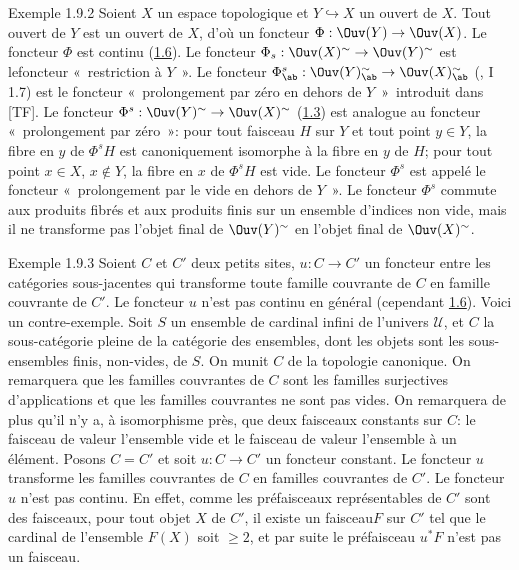 \documentclass[10pt]{../fichiers-configuration-latex/smfart}
\begin{document}
\begin{enonce*}[remark]{Exemple 1.9.2}
Soient $X$ un espace topologique et $Y\hookrightarrow X$ un ouvert
de $X$. Tout ouvert de $Y$ est un ouvert de $X$, d'où un foncteur
$\Phi:\Ouv(Y)\rightarrow \Ouv(X)$. Le foncteur $\Phi$ est continu
(\hyperref[III.prop1.6]{1.6}). Le foncteur $\Phi_s:\Ouv(X)^{\sim}\rightarrow
\Ouv(Y)^{\sim}$ est le\pageoriginale foncteur « restriction à
$Y$ ». Le foncteur $\Phi^s_{\ab}:\Ouv(Y)^{\sim}_{\ab}\rightarrow
\Ouv(X)^{\sim}_{\ab}$ (, I 1.7) est le
foncteur « prolongement par zéro en dehors de $Y$ »\
introduit dans [TF]. Le foncteur $\Phi^s:\Ouv(Y)^{\sim}\rightarrow
\Ouv(X)^{\sim}$ (\hyperref[III.prop1.3]{1.3}) est analogue au foncteur « prolongement par zéro »: pour tout faisceau $H$ sur $Y$ et
tout point $y\in Y$, la fibre en $y$ de $\Phi^sH$ est canoniquement
isomorphe à la fibre en $y$ de $H$; pour tout point $x\in X$,
$x\not\in Y$, la fibre en $x$ de $\Phi^sH$ est vide. Le foncteur
$\Phi^s$ est appelé le foncteur « prolongement par le vide en
dehors de $Y$ ». Le foncteur $\Phi^s$ commute aux produits
fibrés et aux produits finis sur un ensemble d'indices non vide,
mais il ne transforme pas l'objet final de $\Ouv(Y)^{\sim}$ en
l'objet final de $\Ouv(X)^{\sim}$.
\end{enonce*}

\begin{enonce*}[remark]{Exemple 1.9.3}
Soient $C$ et $C'$ deux petits sites, $u:C\rightarrow C'$ un
foncteur entre les catégories sous-jacentes qui transforme toute
famille couvrante de $C$ en famille couvrante de $C'$. Le foncteur
$u$ n'est pas continu en général (\cf cependant
\hyperref[III.prop1.6]{1.6}). Voici un contre-exemple. Soit $S$ un ensemble de
cardinal infini de l'univers $𝒰$, et $C$ la
sous-catégorie pleine de la catégorie des ensembles, dont
les objets sont les sous-ensembles finis, non-vides, de $S$. On
munit $C$ de la topologie canonique. On remarquera que les familles
couvrantes de $C$ sont les familles surjectives d'applications et
que les familles couvrantes ne sont pas vides. On remarquera de plus
qu'il n'y a, à isomorphisme près, que deux faisceaux constants
sur $C$: le faisceau de valeur l'ensemble vide et le faisceau de
valeur l'ensemble à un élément. Posons $C=C'$ et soit
$u:C\rightarrow C'$ un foncteur constant. Le foncteur $u$ transforme
les familles couvrantes de $C$ en familles couvrantes de $C'$. Le
foncteur $u$ n'est pas continu. En effet, comme les préfaisceaux
représentables de $C'$ sont des faisceaux, pour tout objet $X$
de $C'$, il existe un faisceau\pageoriginale $F$ sur $C'$ tel que le
cardinal de l'ensemble $F(X)$ soit $\geq 2$, et par suite le
préfaisceau $u^\ast F$ n'est pas un faisceau.
\end{enonce*}
\end{document}

